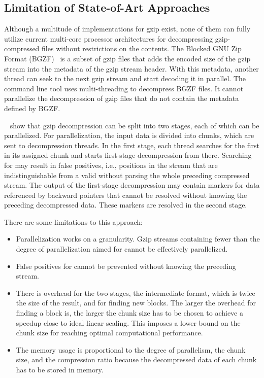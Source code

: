 \subsection{Limitation of State-of-Art Approaches}
\label{sct:limitations}


Although a multitude of implementations for gzip exist, none of them can fully utilize current multi-core processor architectures for decompressing gzip-compressed files without restrictions on the contents.
The Blocked GNU Zip Format (BGZF)~\cite{htslib} is a subset of gzip files that adds the encoded size of the gzip stream into the metadata of the gzip stream header.
With this metadata, another thread can seek to the next gzip stream and start decoding it in parallel.
The command line tool  uses multi-threading to decompress BGZF files.
It cannot parallelize the decompression of gzip files that do not contain the metadata defined by BGZF.

\citeauthor{pugz}~\cite{pugz} show that gzip decompression can be split into two stages, each of which can be parallelized.
For parallelization, the input data is divided into chunks, which are sent to decompression threads.
In the first stage, each thread searches for the first  in its assigned chunk and starts first-stage decompression from there.
Searching for  may result in false positives, i.e., positions in the stream that are indistinguishable from a valid  without parsing the whole preceding compressed stream.
The output of the first-stage decompression may contain markers for data referenced by backward pointers that cannot be resolved without knowing the preceding decompressed data.
These markers are resolved in the second stage.

There are some limitations to this approach:
\begin{itemize}
    \item Parallelization works on a  granularity.
          Gzip streams containing fewer  than the degree of parallelization aimed for cannot be effectively parallelized.
    \item False positives for  cannot be prevented without knowing the preceding  stream.
    \item There is overhead for the two stages, the intermediate format, which is twice the size of the result, and for finding new blocks.
          The larger the overhead for finding a block is, the larger the chunk size has to be chosen to achieve a speedup close to ideal linear scaling.
          This imposes a lower bound on the chunk size for reaching optimal computational performance.
    \item The memory usage is proportional to the degree of parallelism, the chunk size, and the compression ratio because the decompressed data of each chunk has to be stored in memory.
\end{itemize}

